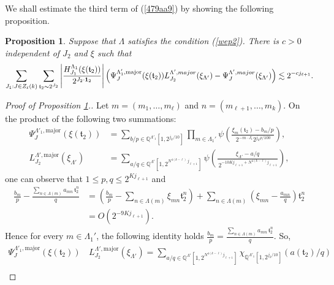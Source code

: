 \documentclass[10pt,a4paper]{amsart}
\newtheorem{proposition}{Proposition}\numberwithin{proposition}{section}
\numberwithin{equation}{section}
\begin{document}
We shall estimate the third term of (\ref{479aa9}) by showing the following proposition. 
\begin{proposition}\label{prop8139}
Suppose that $\Lambda$ satisfies   the  condition (\ref{wep2}). There  is $c>0$  independent of $J_2$ and $\xi$ such that
\begin{align*}
 \sum_{J_1: J\in Z_\ell(k)} \sum_{\mathfrak{t}_2\sim 2^{J_2}} \left|\frac{H^{\Lambda_{1}}_{J_1}( \xi(\mathfrak{t}_2)) }{2^{J_2\cdot {\bf 1}_2} }\right|  \left(\Psi_{J}^{\Lambda'_1,\mathrm{major}}(\xi(\mathfrak{t}_2)) L^{\Lambda',\rm{major}}_{J_2}(\xi_{\Lambda'})-\Psi^{\Lambda',\rm{major}}_{J}(\xi_{\Lambda'})  \right) \lesssim 2^{-cj_{\ell+1}}.
\end{align*}
\end{proposition}
 
\begin{proof}[Proof of Proposition \ref{prop8139}.]
Let $m=(m_1,\dots,m_{\ell})$ and $n=(m_{\ell+1},\dots,m_k)$.  
On the product of the following two summations:
\begin{align*}
\Psi_{J}^{\Lambda'_1,\mathrm{major}}\!\left(\xi(\mathfrak{t}_2)\right)
&= 
\sum_{b/p \in \mathbb{Q}^{\Lambda'_1}[1, 2^{j_k/10}]}  
\prod_{m\in \Lambda_{1}'}
\psi\!\left(
\frac{\xi_{m}(\mathfrak{t}_2)-b_{m}/p}{\,2^{-m\cdot J_1} 2^{j_k\rho/100}}
\right), \\
L^{\Lambda',\mathrm{major}}_{J_2}(\xi_{\Lambda'})
&=
\sum_{a/q \in \mathbb{Q}^{\Lambda'}[1,2^{N^{4(k-\ell)}\,j_{\ell+1}}]}
\psi\!\left(
\frac{\xi_{\Lambda'}-a/q}{\,2^{-10K j_{\ell+1} + N^{4(k-\ell)} j_{\ell+1}}}
\right),
\end{align*}
one can observe  that
 $1 \le p,q \le 2^{K j_{\ell+1}}$  and
\begin{align*}
\frac{b_{m}}{p}
- \frac{\sum_{n\in \Lambda(m)} a_{mn}\,\mathfrak{t}_2^{n}}{q} 
&=
\left(
\frac{b_{m}}{p}
-
\sum_{n\in \Lambda(m)} \xi_{mn}\mathfrak{t}_2^{n}
\right)
+
\sum_{n\in \Lambda(m)}
\left(\xi_{mn}-\frac{a_{mn}}{q}\right)\mathfrak{t}_2^{n}  \\
&= O(2^{-9K j_{\ell+1}}).
\end{align*}
Hence for every \(m \in \Lambda_1'\), the following identity holds
$
\frac{b_m}{p}
=
\frac{\sum_{n\in \Lambda(m)} a_{mn}\,\mathfrak{t}_2^{n}}{q}.
$
So,  
\begin{align*}
\Psi_{J}^{\Lambda'_1,\mathrm{major}}\!\left(\xi(\mathfrak{t}_2)\right)
\, &L^{\Lambda',\mathrm{major}}_{J_2}(\xi_{\Lambda'})=\sum_{a/q \in \mathbb{Q}^{\Lambda'}[1,2^{N^{4(k-\ell)}j_{\ell+1}}]}    \chi_{ \mathbb{Q}^{\Lambda'_1}[1, 2^{j_k/10}]  }(a(\mathfrak{t}_2)/q)\\

\end{align*}
\end{proof}
\end{document}
